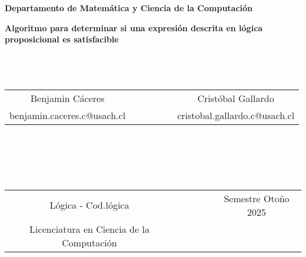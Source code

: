 \documentclass{article}
\begin{document}
\begin{titlepage}
\begin{center}
\end{center}
\begin{center}
{\bf Departamento de Matem\'atica y Ciencia de la Computaci\'on}
\end{center}
\vspace{3cm}
\begin{center}
%
%
{\Large \bf Algoritmo para determinar si una expresión descrita en lógica proposicional es satisfacible}
%
%
~ \\ 
~ \\ 
~ \\
~ \\
\begin{tabular}{c c c}
%
%
%
%
Benjamin Cáceres & ~~~~~~~ & Cristóbal Gallardo\\
%
%
%
%
benjamin.caceres.c@usach.cl & & cristobal.gallardo.c@usach.cl \\
\end{tabular}
~ \\ 
~ \\ 
~ \\
~ \\
\begin{tabular}{c c c}
%
%
%
%
Lógica - Cod.lógica & ~~~~~~ & Semestre Otoño 2025 \\
%
%
%
%
Licenciatura en Ciencia de la Computaci\'on & &  \\
\end{tabular}
\end{center}
\end{titlepage}
%
\end{document}

